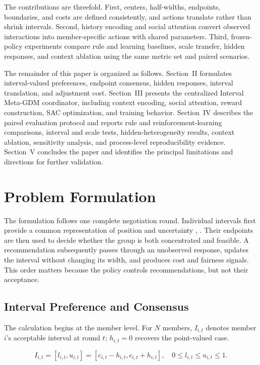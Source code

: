 \documentclass[journal]{IEEEtran}
\begin{document}
The contributions are threefold. First, centers, half-widths, endpoints, boundaries, and costs are defined consistently, and actions translate rather than shrink intervals. Second, history encoding and social attention convert observed interactions into member-specific actions with shared parameters. Third, frozen-policy experiments compare rule and learning baselines, scale transfer, hidden responses, and context ablation using the same metric set and paired scenarios.

The remainder of this paper is organized as follows. Section~II formulates interval-valued preferences, endpoint consensus, hidden responses, interval translation, and adjustment cost. Section~III presents the centralized Interval Meta-GDM coordinator, including context encoding, social attention, reward construction, SAC optimization, and training behavior. Section~IV describes the paired evaluation protocol and reports rule and reinforcement-learning comparisons, interval and scale tests, hidden-heterogeneity results, context ablation, sensitivity analysis, and process-level reproducibility evidence. Section~V concludes the paper and identifies the principal limitations and directions for further validation.
\section{Problem Formulation}
\label{sec:problem}

The formulation follows one complete negotiation round. Individual intervals first provide a common representation of position and uncertainty \cite{ref16}, \cite{ref17}. Their endpoints are then used to decide whether the group is both concentrated and feasible. A recommendation subsequently passes through an unobserved response, updates the interval without changing its width, and produces cost and fairness signals. This order matters because the policy controls recommendations, but not their acceptance.

\subsection{Interval Preference and Consensus}

The calculation begins at the member level. For $N$ members, $I_{i,t}$ denotes member $i$'s acceptable interval at round $t$; $h_{i,t}=0$ recovers the point-valued case.

\begin{equation}
I_{i,t}=[l_{i,t},u_{i,t}]
=[c_{i,t}-h_{i,t},c_{i,t}+h_{i,t}],\quad
0\le l_{i,t}\le u_{i,t}\le 1.
\label{eq:interval}
\end{equation}
\end{document}
